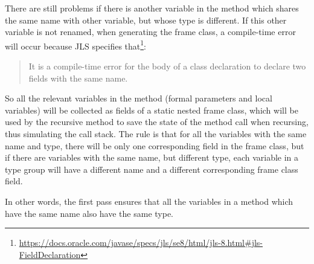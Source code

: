 There are still problems if there is another variable in the method which shares the same name with other variable, but
whose type is different. If this other variable is not renamed, when generating the frame class, a compile-time error
will occur because JLS specifies that\footnote{\url{https://docs.oracle.com/javase/specs/jls/se8/html/jls-8.html#jls-FieldDeclaration}}:
\begin{quote}
    It is a compile-time error for the body of a class declaration to declare two fields with the same name.
\end{quote}

So all the relevant variables in the method (formal parameters and local variables) will be collected as fields of a
static nested frame class, which will be used by the recursive method to save the state of the method call when
recursing, thus simulating the call stack. The rule is that for all the variables with the same name and type, there
will be only one corresponding field in the frame class, but if there are variables with the same name, but different
type, each variable in a type group will have a different name and a different corresponding frame class field.

In other words, the first pass ensures that all the variables in a method which have the same name also have the same
type.


